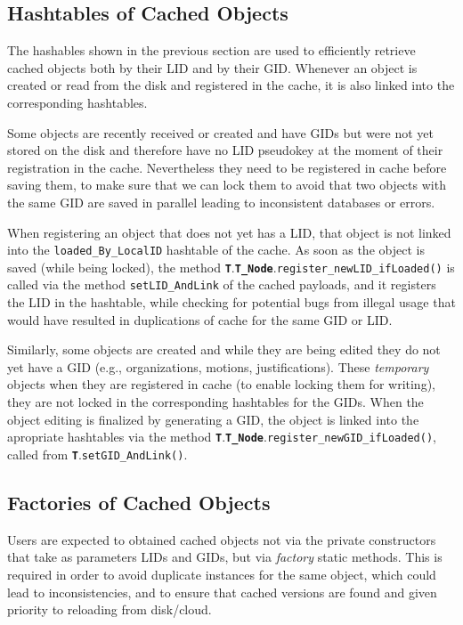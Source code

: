 \documentclass{book}
\newcommand{\cls}[1]{{\tt\bf #1}}
\newcommand{\mth}[1]{{\tt #1}}
\newcommand{\mmb}[1]{{\tt #1}}
\begin{document}
\subsection{Hashtables of Cached Objects}
The hashables shown in the previous section are used to efficiently retrieve cached objects both by their LID and by their GID.
Whenever an object is created or read from the disk and registered in the cache, it is also linked into the corresponding hashtables.

Some objects are recently received or created and have GIDs but were not yet stored on the disk and therefore have no LID pseudokey at the
moment of their registration in the cache. Nevertheless they need to be registered in cache before saving them,
to make sure that we can lock them to avoid that two objects with the same GID are saved in parallel leading to
inconsistent databases or errors.

When registering an object that does not yet has a LID, that object is not linked into the \mmb{loaded\_By\_LocalID}
hashtable of the cache. As soon as the object is saved (while being locked), the method \cls{T}.\cls{T\_Node}.\mth{register\_newLID\_ifLoaded()}
is called via the method \mth{setLID\_AndLink} of the cached payloads, and it registers the LID in the hashtable, while
checking for potential bugs from illegal usage that would have resulted in duplications of cache for the same GID or LID.

Similarly, some objects are created and while they are being edited they do not yet have a GID (e.g., organizations, motions, justifications).
These {\em temporary} objects when they are registered in cache (to enable locking them for writing), they are not locked in
the corresponding hashtables for the GIDs. When the object editing is finalized by generating a GID, the object is linked
into the apropriate hashtables via the method \cls{T}.\cls{T\_Node}.\mth{register\_newGID\_ifLoaded()}, called from 
\cls{T}.\mth{setGID\_AndLink()}.

\subsection{Factories of Cached Objects}

Users are expected to obtained cached objects not via the private constructors that take as parameters LIDs and GIDs,
but via {\em factory} static methods. This is required in order to avoid duplicate instances for the same object, which could
lead to inconsistencies, and to ensure that cached versions are found and given priority to reloading from disk/cloud.
\end{document}
